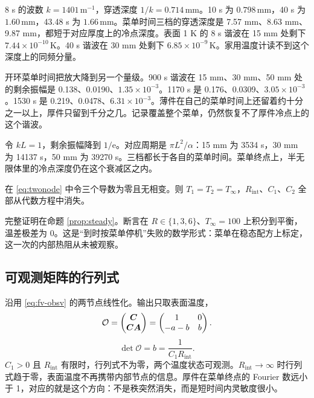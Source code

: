 8 s 的波数 \(k=1401\,\mathrm{m}^{-1}\)，穿透深度 \(1/k=0.714\,\mathrm{mm}\)。10 s 为 \(0.798\,\mathrm{mm}\)，40 s 为 \(1.60\,\mathrm{mm}\)，43.48 s 为 \(1.66\,\mathrm{mm}\)。菜单时间三档的穿透深度是 7.57 mm、8.63 mm、9.87 mm，都短于对应厚度上的冷点深度。表面 1 K 的 8 s 谐波在 15 mm 处剩下 \(7.44\times 10^{-10}\,\mathrm{K}\)。40 s 谐波在 30 mm 处剩下 \(6.85\times 10^{-9}\,\mathrm{K}\)。家用温度计读不到这个深度上的同频分量。

开环菜单时间把放大降到另一个量级。900 s 谐波在 15 mm、30 mm、50 mm 处的剩余振幅是 0.138、0.0190、\(1.35\times 10^{-3}\)。1170 s 是 0.176、0.0309、\(3.05\times 10^{-3}\)。1530 s 是 0.219、0.0478、\(6.31\times 10^{-3}\)。薄件在自己的菜单时间上还留着约十分之一以上，厚件只留到千分之几。记录覆盖整个菜单，仍然恢复不了厚件冷点上的这个谐波。

令 \(kL=1\)，剩余振幅降到 \(1/\mathrm{e}\)。对应周期是 \(\pi L^2/\alpha\)：15 mm 为 3534 s，30 mm 为 14137 s，50 mm 为 39270 s。三档都长于各自的菜单时间。菜单终点上，半无限体里的冷点深度仍在这个衰减区之内。

\begin{proposition}[静态观测不足以分离内外热阻]
在 \eqref{eq:twonode} 中令三个导数为零且无相变。则 \(T_1=T_2=T_\infty\)，\(R_{\mathrm{int}}\)、\(C_1\)、\(C_2\) 全部从代数方程中消失。
\end{proposition}

完整证明在命题 \ref{prop:steady}。断言在 \(R\in\{1,3,6\}\)、\(T_\infty=100\) 上积分到平衡，温差极差为 0。这是“到时按菜单停机”失败的数学形式：菜单在稳态配方上标定，这一次的内部热阻从未被观察。

\subsection{可观测矩阵的行列式}

沿用 \eqref{eq:fv-obsv} 的两节点线性化。输出只取表面温度，
\[
\mathcal{O}=\begin{pmatrix}\bm{C}\\ \bm{C}\bm{A}\end{pmatrix}
=\begin{pmatrix}1&0\\ -a-b& b\end{pmatrix}.
\]
\[
\det\mathcal{O}=b=\frac{1}{C_1 R_{\mathrm{int}}}.
\]
\(C_1>0\) 且 \(R_{\mathrm{int}}\) 有限时，行列式不为零，两个温度状态可观测。\(R_{\mathrm{int}}\to\infty\) 时行列式趋于零，表面温度不再携带内部节点的信息。厚件在菜单终点的 Fourier 数远小于 1，对应的就是这个方向：不是秩突然消失，而是短时间内灵敏度很小。

